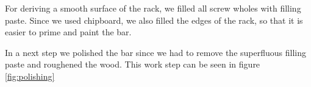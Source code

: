 \documentclass{acm_proc_article-sp}
\begin{document}
For deriving a smooth surface of the rack, we filled all screw wholes with filling paste. Since we used chipboard, we also filled the edges of the rack, so that it is easier to prime and paint the bar. 

\begin{minipage}{\linewidth}%
\label{fig:polishing}%
\end{minipage}


In a next step we polished the bar since we had to remove the superfluous filling paste and roughened the wood. This work step can be seen in figure \ref{fig:polishing}

\begin{minipage}{\linewidth}%
\label{fig:priming}%
\end{minipage}
 
\end{document}

